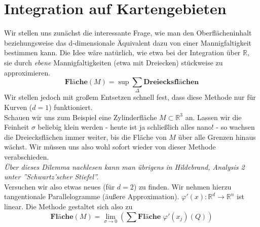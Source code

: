 \section{Integration auf Kartengebieten}
Wir stellen uns zunächst die interessante Frage, wie man den Oberflächeninhalt beziehungsweise das d-dimensionale Äquivalent dazu von einer Mannigfaltigkeit bestimmen kann. 
Die Idee wäre natürlich, wie etwa bei der Integration über $\mathbb{R}$, sie durch \emph{ebene} Mannigfaltigkeiten (etwa mit Dreiecken) stückweise zu approximieren.
\begin{equation*}
\textbf{Fläche}(M)=\sup \sum\limits_\Delta \textbf{Dreiecksflächen}
\end{equation*}
Wir stellen jedoch mit großem Entsetzen schnell fest, dass diese Methode nur für Kurven ($d=1$) funktioniert.\\
\linebreak
Schauen wir uns zum Beispiel eine Zylinderfläche $M\subset\mathbb{R}^3$ an. 
Lassen wir die Feinheit $\sigma$ beliebig klein werden - heute ist ja schließlich alles nano! - so wachsen die Dreiecksflächen immer weiter, 
bis die Fläche von $M$ über alle Grenzen hinaus wächst. Wir müssen uns also wohl sofort wieder von dieser Methode verabschieden.\\
\emph{Über dieses Dilemma nachlesen kann man übrigens in Hildebrand, Analysis 2 unter ''Schwartz'scher Stiefel''.}\\
\linebreak
Versuchen wir also etwas neues (für $d=2$) zu finden. Wir nehmen hierzu tangentionale Parallelogramme (äußere Approximation).
$\varphi'(x):\mathbb{R}^d\rightarrow\mathbb{R}^n$ ist linear. Die Methode gestaltet sich also zu
\begin{equation*}
\textbf{Fläche}(M)=\lim\limits_{\sigma\rightarrow 0}\left(\sum\textbf{Fläche\ }\varphi'(x_j)(Q)\right)
\end{equation*}